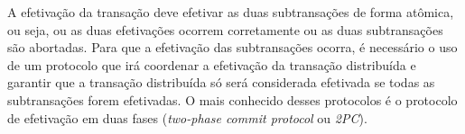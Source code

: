 \documentclass[11pt,twoside,a4paper]{book}
\begin{document}


A efetivação da transação deve efetivar as duas subtransações de forma atômica, ou seja, ou as duas efetivações ocorrem corretamente ou as duas subtransações são abortadas. Para que a efetivação das subtransações ocorra, é necessário o uso de um protocolo que irá coordenar a efetivação da transação distribuída e garantir que a transação distribuída só será considerada efetivada se todas as subtransações forem efetivadas. O mais conhecido desses protocolos é o protocolo de efetivação em duas fases (\emph{two-phase commit protocol} ou \emph{2PC}).


\end{document}
